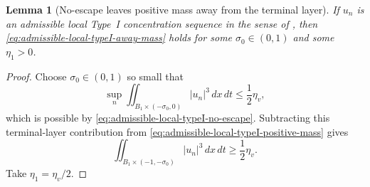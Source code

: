 \documentclass[11pt]{amsart}
\numberwithin{equation}{section}
\theoremstyle{plain}
\newtheorem{lemma}[lemma]{Lemma}
\theoremstyle{definition}
\theoremstyle{remark}
\begin{document}
\begin{lemma}[No-escape leaves positive mass away from the terminal layer]
\label{lem:local-no-escape-away-mass}
If \(u_n\) is an admissible local Type~I concentration sequence in the sense of
, then
\eqref{eq:admissible-local-typeI-away-mass} holds for some
\(\sigma_0\in(0,1)\) and some \(\eta_1>0\).
\end{lemma}

\begin{proof}
Choose \(\sigma_0\in(0,1)\) so small that
\[
   \sup_n
   \iint_{B_1\times(-\sigma_0,0)} |u_n|^3\,dx\,dt
   \le \frac12\eta_v ,
\]
which is possible by \eqref{eq:admissible-local-typeI-no-escape}.  Subtracting
this terminal-layer contribution from
\eqref{eq:admissible-local-typeI-positive-mass} gives
\[
   \iint_{B_1\times(-1,-\sigma_0)} |u_n|^3\,dx\,dt
   \ge \frac12\eta_v .
\]
Take \(\eta_1=\eta_v/2\).
\end{proof}
\end{document}
